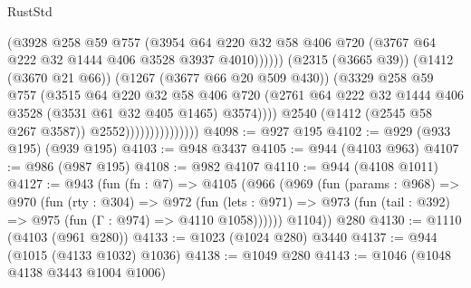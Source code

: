 \begin{lexlean}{RustStd}
\begin{coremodule}
{\begin{coremodule}
{{{{{{{{{{                                          (@3928
                                            @258
                                            @59
                                            @757
                                            (@3954
                                              @64
                                              @220
                                              @32
                                              @58
                                              @406
                                              @720
                                              (@3767 @64 @222 @32 @1444 @406 @3528 @3937 @4010))))))
                                    (@2315 (@3665 @39))
                                    (@1412 (@3670 @21 @66))
                                    (@1267 (@3677 @66 @20 @509 @430))
                                    (@3329
                                      @258
                                      @59
                                      @757
                                      (@3515
                                        @64
                                        @220
                                        @32
                                        @58
                                        @406
                                        @720
                                        (@2761
                                          @64
                                          @222
                                          @32
                                          @1444
                                          @406
                                          @3528
                                          (@3531 @61 @32 @405 @1465)
                                          @3574))))
                                  @2540
                                  (@1412 (@2545 @58 @267 @3587))
                                  @2552)))))))))))))))
@4098 := @927 @195
@4102 := @929 (@933 @195) (@939 @195)
@4103 := @948 @3437
@4105 := @944 (@4103 @963)
@4107 := @986 (@987 @195)
@4108 := @982 @4107
@4110 := @944 (@4108 @1011)
@4127 := @943
    (fun (fn : @7) =>
    @4105
      (@966
        (@969
          (fun (params : @968) =>
          @970
            (fun (rty : @304) =>
            @972
              (fun (lets : @971) =>
              @973 (fun (tail : @392) => @975 (fun (Γ : @974) => @4110 @1058))))))
        @1104))
    @280
@4130 := @1110 (@4103 (@961 @280))
@4133 := @1023 (@1024 @280) @3440
@4137 := @944 (@1015 (@4133 @1032) @1036)
@4138 := @1049 @280
@4143 := @1046 (@1048 @4138 @3443 @1004 @1006)
}}}}}}}}}}
\end{coremodule}}
\end{coremodule}
\end{lexlean}
